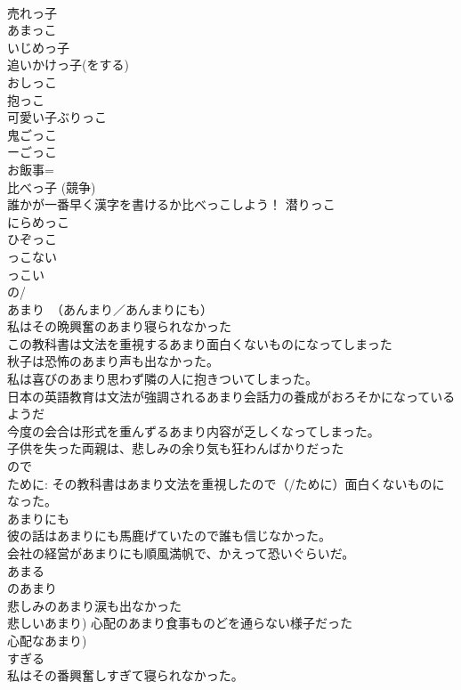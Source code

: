 \documentclass[8pt]{extreport}
\begin{document}
\begin{CJK}{UTF8}{min}
\\	売れっ子 
\\	あまっこ　 
\\	いじめっ子　
\\	追いかけっ子(をする) 
\\	おしっこ 
\\	抱っこ　　
\\	可愛い子ぶりっこ 
\\	鬼ごっこ 
\\	ーごっこ 
\\	お飯事=
\\	比べっ子 (競争) 
\\	誰かが一番早く漢字を書けるか比べっこしよう！ 潜りっこ 
\\	にらめっこ 
\\	ひぞっこ　
\\	っこない 
\\	っこい 
\\	の/
\\	あまり　（あんまり／あんまりにも） 
\\	私はその晩興奮のあまり寝られなかった 
\\	この教科書は文法を重視するあまり面白くないものになってしまった 
\\	秋子は恐怖のあまり声も出なかった。 
\\	私は喜びのあまり思わず隣の人に抱きついてしまった。 
\\	日本の英語教育は文法が強調されるあまり会話力の養成がおろそかになっているようだ 
\\	今度の会合は形式を重んずるあまり内容が乏しくなってしまった。 
\\	子供を失った両親は、悲しみの余り気も狂わんばかりだった　
\\	ので 
\\	ために: その教科書はあまり文法を重視したので（/ために）面白くないものになった。 
\\	あまりにも 
\\	彼の話はあまりにも馬鹿げていたので誰も信じなかった。
\\	会社の経営があまりにも順風満帆で、かえって恐いぐらいだ。
\\	あまる 
\\	のあまり 
\\	悲しみのあまり涙も出なかった　
\\	悲しいあまり) 心配のあまり食事ものどを通らない様子だった 
\\	心配なあまり)	
\\	すぎる 
\\	私はその番興奮しすぎて寝られなかった。 

\end{CJK}
\end{document}
